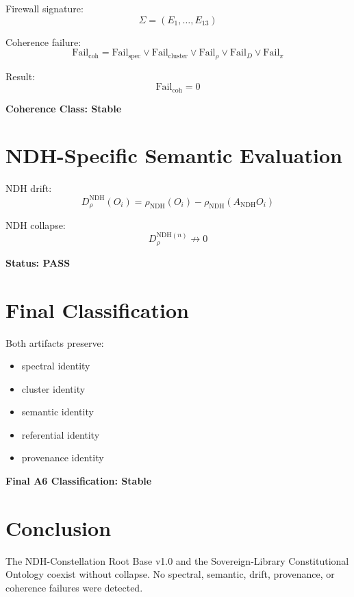 \documentclass[12pt]{article}
\begin{document}
Firewall signature:
\[
\Sigma = (E_1, \ldots, E_{13})
\]

Coherence failure:
\[
\mathrm{Fail}_{\mathrm{coh}} =
\mathrm{Fail}_{\mathrm{spec}} \lor
\mathrm{Fail}_{\mathrm{cluster}} \lor
\mathrm{Fail}_{\rho} \lor
\mathrm{Fail}_{D} \lor
\mathrm{Fail}_{\pi}
\]

Result:
\[
\mathrm{Fail}_{\mathrm{coh}} = 0
\]

\textbf{Coherence Class: Stable}

\section{NDH-Specific Semantic Evaluation}

NDH drift:
\[
D_{\rho}^{\mathrm{NDH}}(O_i)
  = \rho_{\mathrm{NDH}}(O_i) - \rho_{\mathrm{NDH}}(A_{\mathrm{NDH}} O_i)
\]

NDH collapse:
\[
D_{\rho}^{\mathrm{NDH}(n)} \not\to 0
\]

\textbf{Status: PASS}

\section{Final Classification}

Both artifacts preserve:

\begin{itemize}
  \item spectral identity
  \item cluster identity
  \item semantic identity
  \item referential identity
  \item provenance identity
\end{itemize}

\textbf{Final A6 Classification: Stable}

\section{Conclusion}

The NDH-Constellation Root Base v1.0 and the Sovereign-Library Constitutional
Ontology coexist without collapse. No spectral, semantic, drift, provenance,
or coherence failures were detected.
\end{document}
